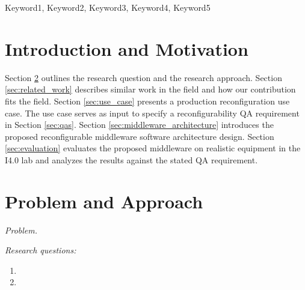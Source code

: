 \documentclass[conference]{IEEEtran}
\begin{document}
\listoftodos[autohide, title=\textcolor{red}{TODO LIST}]
\maketitle
\IEEEpubidadjcol
\begin{abstract}



    



\end{abstract}

\begin{IEEEkeywords}
Keyword1, Keyword2, Keyword3, Keyword4, Keyword5
\end{IEEEkeywords}

\section{Introduction and Motivation}

Section \ref{sec:problem} outlines the research question and the research approach. 
Section \ref{sec:related_work} describes similar work in the field and how our contribution fits the field.
Section \ref{sec:use_case} presents a production reconfiguration use case.
The use case serves as input to specify a reconfigurability QA requirement in Section \ref{sec:qas}.
Section \ref{sec:middleware_architecture} introduces the proposed reconfigurable middleware software architecture design.
Section \ref{sec:evaluation} evaluates the proposed middleware on realistic equipment in the I4.0 lab and analyzes the results against the stated QA requirement.   

\section{Problem and Approach}

\label{sec:problem}
\emph{Problem.}

\emph{Research questions:}
\begin{enumerate}
    \item  
    \item 
\end{enumerate}
\end{document}
